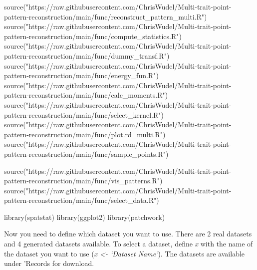 \documentclass[
  letterpaper,
  DIV=11,
  numbers=noendperiod]{scrreprt}
\newenvironment{Shaded}{\begin{snugshade}}{\end{snugshade}}
\newcommand{\FunctionTok}[1]{\textcolor[rgb]{0.28,0.35,0.67}{#1}}
\newcommand{\NormalTok}[1]{\textcolor[rgb]{0.00,0.23,0.31}{#1}}
\newcommand{\StringTok}[1]{\textcolor[rgb]{0.13,0.47,0.30}{#1}}
\begin{document}
\begin{Shaded}
\begin{Highlighting}[]
\FunctionTok{source}\NormalTok{(}\StringTok{"https://raw.githubusercontent.com/ChrisWudel/Multi{-}trait{-}point{-}pattern{-}reconstruction/main/func/reconstruct\_pattern\_multi.R"}\NormalTok{)}
\FunctionTok{source}\NormalTok{(}\StringTok{"https://raw.githubusercontent.com/ChrisWudel/Multi{-}trait{-}point{-}pattern{-}reconstruction/main/func/compute\_statistics.R"}\NormalTok{)}
\FunctionTok{source}\NormalTok{(}\StringTok{"https://raw.githubusercontent.com/ChrisWudel/Multi{-}trait{-}point{-}pattern{-}reconstruction/main/func/dummy\_transf.R"}\NormalTok{)}
\FunctionTok{source}\NormalTok{(}\StringTok{"https://raw.githubusercontent.com/ChrisWudel/Multi{-}trait{-}point{-}pattern{-}reconstruction/main/func/energy\_fun.R"}\NormalTok{)}
\FunctionTok{source}\NormalTok{(}\StringTok{"https://raw.githubusercontent.com/ChrisWudel/Multi{-}trait{-}point{-}pattern{-}reconstruction/main/func/calc\_moments.R"}\NormalTok{)}
\FunctionTok{source}\NormalTok{(}\StringTok{"https://raw.githubusercontent.com/ChrisWudel/Multi{-}trait{-}point{-}pattern{-}reconstruction/main/func/select\_kernel.R"}\NormalTok{)}
\FunctionTok{source}\NormalTok{(}\StringTok{"https://raw.githubusercontent.com/ChrisWudel/Multi{-}trait{-}point{-}pattern{-}reconstruction/main/func/plot.rd\_multi.R"}\NormalTok{)}
\FunctionTok{source}\NormalTok{(}\StringTok{"https://raw.githubusercontent.com/ChrisWudel/Multi{-}trait{-}point{-}pattern{-}reconstruction/main/func/sample\_points.R"}\NormalTok{)}

\FunctionTok{source}\NormalTok{(}\StringTok{"https://raw.githubusercontent.com/ChrisWudel/Multi{-}trait{-}point{-}pattern{-}reconstruction/main/func/vis\_patterns.R"}\NormalTok{)}
\FunctionTok{source}\NormalTok{(}\StringTok{"https://raw.githubusercontent.com/ChrisWudel/Multi{-}trait{-}point{-}pattern{-}reconstruction/main/func/select\_data.R"}\NormalTok{)}

\FunctionTok{library}\NormalTok{(spatstat)}
\FunctionTok{library}\NormalTok{(ggplot2)}
\FunctionTok{library}\NormalTok{(patchwork)}
\end{Highlighting}
\end{Shaded}

Now you need to define which dataset you want to use. There are 2 real
datasets and 4 generated datasets available. To select a dataset, define
\emph{x} with the name of the dataset you want to use (\emph{x
\textless- `Dataset Name'}). The datasets are available under 'Records
for download.
\end{document}
